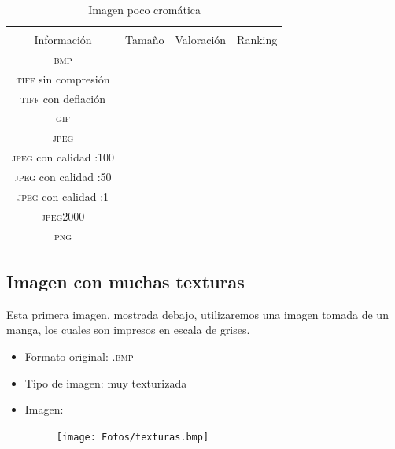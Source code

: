 \documentclass[11pt,a4paper]{article}
\begin{document}
\begin{table}[H]
\centering
\begin{tabular}{|c|c|c|c|}
\hline
\diagbox[width=15em]{\textit{Códec}/Formato}{\\Información} & Tamaño & Valoración & Ranking \\
\hline
\textsc{bmp} &  &  &  \\ \hline
\textsc{tiff} sin compresión &  &  &  \\ \hline
\textsc{tiff} con deflación &  &  &  \\ \hline
\textsc{gif} &  &  &  \\ \hline
\textsc{jpeg} &  &  &  \\ \hline
\textsc{jpeg} con calidad :100 &  &  &  \\ \hline
\textsc{jpeg} con calidad :50 &  &  &  \\ \hline
\textsc{jpeg} con calidad :1 &  &  &  \\ \hline
\textsc{jpeg2000} &  &  &  \\ \hline
\textsc{png} &  &  &  \\ \hline
\end{tabular}
\caption{Imagen poco cromática}
\label{tab:my-table}
\end{table}


\subsection{Imagen con muchas texturas}

Esta primera imagen, mostrada debajo, utilizaremos una imagen tomada de un manga, los cuales son impresos en escala de grises.

\begin{itemize}
	\item Formato original: \textsc{.bmp}
	\item Tipo de imagen: muy texturizada
	\item Imagen:
		\begin{figure}[H]
		\centering
			\texttt{[image: Fotos/texturas.bmp]}
		\end{figure}	
\end{itemize}
\end{document}
